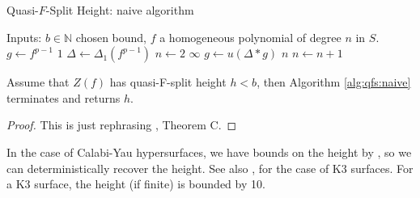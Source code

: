 \begin{algorithm}
\caption{Quasi-\(F\)-Split Height: naive algorithm}
\label{alg:qfs:naive}
\begin{algorithmic}[1]
\State Inputs: \(b \in \mathbb{N}\) chosen bound, \(f\) a homogeneous
	polynomial of degree \(n\) in \(S\).
\State \(g \gets f^{p-1}\) 
    \State \Return \(1\) 
\EndIf
\State \(\Delta \gets \Delta_{1}(f^{p-1})\) 
\State \(n \gets 2\) 
        \State \Return \(\infty\)
    \EndIf
    \State \(g \gets u(\Delta * g)\) 
        \State \Return \(n\) 
    \EndIf
    \State \(n \gets n + 1\)
\EndWhile
\end{algorithmic}
\end{algorithm}

%

\begin{thm}
	Assume that
	\(Z(f)\) has quasi-F-split height \(h < b\),
	then Algorithm \ref{alg:qfs:naive} terminates
	and returns \(h\).
\end{thm}

\begin{proof}
	This is just rephrasing \cite{kty-2022-fedder}, Theorem C.
\end{proof}

In the case of Calabi-Yau hypersurfaces, we have bounds on the height by
\cite{van-der-geer-katsura-2003-calabi-yau},
so we can deterministically recover the height.  
See also \cite[Theorem~0.1]{artin-1974-k3-surfaces},
for the case of K3 surfaces.
For a K3 surface, the height (if finite) is bounded by 10.

